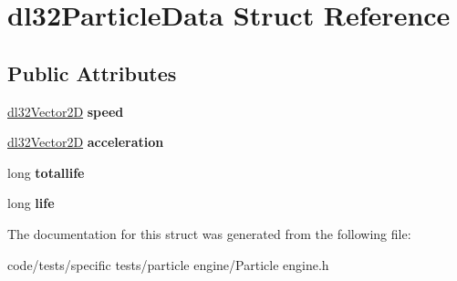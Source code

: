 \hypertarget{structdl32_particle_data}{\section{dl32\-Particle\-Data Struct Reference}
\label{structdl32_particle_data}
}
\subsection*{Public Attributes}
\begin{DoxyCompactItemize}
\item 
\hypertarget{structdl32_particle_data_ae5b2e766fa7e37bcd226aa4179334096}{\hyperlink{structdl32_vector2_d}{dl32\-Vector2\-D} {\bfseries speed}}\label{structdl32_particle_data_ae5b2e766fa7e37bcd226aa4179334096}

\item 
\hypertarget{structdl32_particle_data_ad18fa2f5d358cc0df634cd841087f51d}{\hyperlink{structdl32_vector2_d}{dl32\-Vector2\-D} {\bfseries acceleration}}\label{structdl32_particle_data_ad18fa2f5d358cc0df634cd841087f51d}

\item 
\hypertarget{structdl32_particle_data_a7554a1d4d9107505b2b11a5488399424}{long {\bfseries totallife}}\label{structdl32_particle_data_a7554a1d4d9107505b2b11a5488399424}

\item 
\hypertarget{structdl32_particle_data_a18fb71d40807239fca5537dd44529275}{long {\bfseries life}}\label{structdl32_particle_data_a18fb71d40807239fca5537dd44529275}

\end{DoxyCompactItemize}


The documentation for this struct was generated from the following file\-:\begin{DoxyCompactItemize}
\item 
code/tests/specific tests/particle engine/Particle engine.\-h\end{DoxyCompactItemize}
